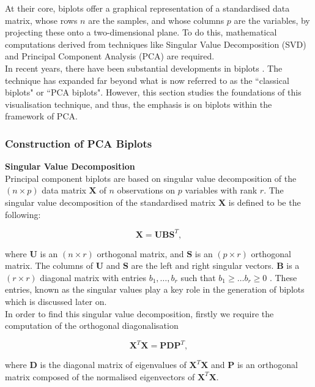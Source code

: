 \documentclass{article}\usepackage[]{graphicx}\usepackage[]{xcolor}
\numberwithin{equation}{section}
\begin{document}
\noindent At their core, biplots offer a graphical representation of a standardised data matrix, whose rows \(n\) are the samples, and whose columns \(p\) are the variables, by projecting these onto a two-dimensional plane. To do this, mathematical computations derived from techniques like Singular Value Decomposition (SVD) and Principal Component Analysis (PCA) are required.\\

\noindent In recent years, there have been substantial developments in biplots \cite{gower1995biplots}. The technique has expanded far beyond what is now referred to as the ``classical biplots" or ``PCA biplots". However, this section studies the foundations of this visualisation technique, and thus, the emphasis is on biplots within the framework of PCA.

\subsubsection{Construction of PCA Biplots}

\noindent \textbf{Singular Value Decomposition}\\
\noindent Principal component biplots are based on singular value decomposition of the $(n \times p)$ data matrix $\mathbf{X}$ of $n$ observations on $p$ variables with rank $r$. The singular value decomposition of the standardised matrix $\mathbf{X}$ is defined to be the following:

\[\mathbf{X} = \mathbf{U}\mathbf{B}\mathbf{S}^{T}, \]

\noindent where $\mathbf{U}$ is an $(n \times r)$ orthogonal matrix, and $\mathbf{S}$ is an $(p \times r)$ orthogonal matrix. The columns of $\mathbf{U}$ and $\mathbf{S}$ are the left and right singular vectors. $\mathbf{B}$ is a $(r \times r)$ diagonal matrix with entries $b_1, \ldots, b_r$ such that $b_1 \geq \dots b_r \geq 0$ \cite{jolliffe2003principal}. These entries, known as the singular values play a key role in the generation of biplots which is discussed later on.\\

\noindent In order to find this singular value decomposition, firstly we require the computation of the orthogonal diagonalisation  

\[
\mathbf{X}^T\mathbf{X}=\mathbf{PDP}^T,
\] 

\noindent where $\mathbf{D}$ is the diagonal matrix of eigenvalues of $\mathbf{X}^T\mathbf{X}$ and $\mathbf{P}$ is an orthogonal matrix composed of the normalised eigenvectors of $\mathbf{X}^T\mathbf{X}$.\\
\end{document}
